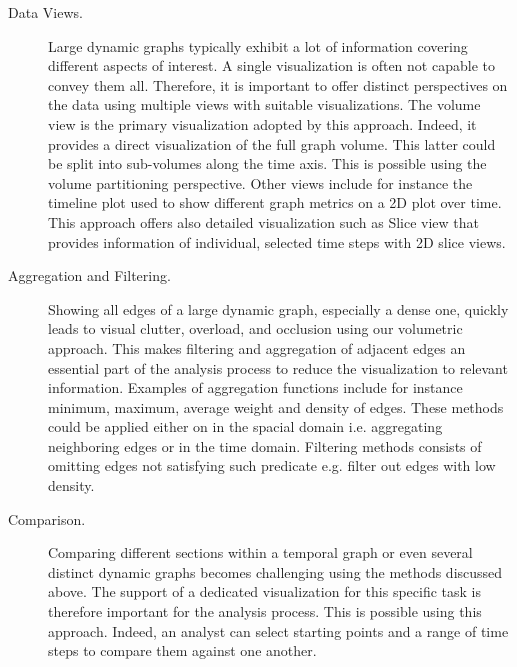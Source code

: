 \begin{description}
	\item[Data Views.] 
	Large dynamic graphs typically exhibit a lot of information covering different aspects of interest. 
	A single visualization is often not capable to convey them all.
	Therefore, it is important to offer distinct perspectives on the data using multiple views with suitable visualizations. 
	The volume view is the primary visualization adopted by this approach.  Indeed, it provides a direct visualization of the full graph volume. This latter could be split into sub-volumes along the time axis. This is possible using the volume partitioning perspective.
	Other views include for instance the timeline plot used to show different graph metrics on a 2D plot over time. 
	This approach offers also detailed visualization such as Slice view that provides information of individual, selected time steps with 2D slice  views. 
	\item[Aggregation and Filtering.] 
	Showing all edges of a large dynamic graph, especially a dense one, quickly leads to visual clutter, overload, and occlusion using our volumetric approach. 
	This makes filtering and aggregation of adjacent edges an essential part of the analysis process to reduce the visualization to relevant information.
	Examples of aggregation functions include for instance minimum, maximum, average weight and density of edges. These methods could be applied either on in the spacial domain i.e. aggregating neighboring edges or in the time domain.
	Filtering methods consists of omitting edges not satisfying such predicate e.g. filter out edges with low density.
	\item[Comparison.] 
	Comparing different sections within a temporal graph or even several distinct dynamic graphs becomes challenging using the methods discussed above. 
	The support of a dedicated visualization for this specific task is therefore important for the analysis process.
	This is possible using this approach. Indeed, an analyst can select starting points and a range of time steps to compare them against one another.

\end{description}
